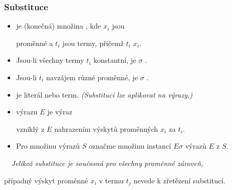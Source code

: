     
    
    
    \subsubsection*{Substituce}
    
    \begin{itemize}
    \item {} je (konečná) množina , kde $x_i$ jsou
    \smallskip
    
     proměnné a $t_i$ jsou termy, přičemž $t_i$  $x_i$.
    \smallskip
    
    \item Jsou-li všechny termy $t_i$ konstantní, je $\sigma$ .
    \smallskip
    
    \item Jsou-li $t_i$ navzájem různé proměnné, je $\sigma$ .
    \smallskip
    
    \item {} je literál nebo term. \emph{(Substituci lze aplikovat na výrazy.)}
    \smallskip
    
    \item {} výrazu $E$   je výraz 
    \smallskip
    
    vzniklý z $E$  nahrazením  výskytů proměnných $x_i$ za $t_i$.
    \smallskip
    
    \item Pro množinu výrazů $S$ označme  množinu instancí $E\sigma$ výrazů $E$ z $S$.
    \end{itemize}
    \smallskip
    
    {\it {}\ \ Jelikož substituce je současná pro všechny proměnné zároveň,
    \smallskip
    
    případný výskyt proměnné $x_i$ v termu $t_j$ nevede k zřetězení substitucí.}
    \medskip
    
    
    \vspace{-6mm}
    
